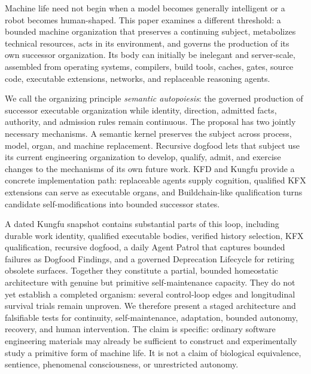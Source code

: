 \documentclass[10pt]{article}
\begin{document}
\clearpage
{}\par
\vspace{0.08in}
\begin{mlabstractbox}

Machine life need not begin when a model becomes generally intelligent or a
robot becomes human-shaped. This paper examines a different threshold: a
bounded machine organization that preserves a continuing subject, metabolizes
technical resources, acts in its environment, and governs the production of
its own successor organization. Its body can initially be inelegant and
server-scale, assembled from operating systems, compilers, build tools,
caches, gates, source code, executable extensions, networks, and replaceable
reasoning agents.

We call the organizing principle \emph{semantic autopoiesis}: the governed
production of successor executable organization while identity, direction,
admitted facts, authority, and admission rules remain continuous. The proposal
has two jointly necessary mechanisms. A semantic kernel preserves the subject
across process, model, organ, and machine replacement. Recursive dogfood lets
that subject use its current engineering organization to develop, qualify,
admit, and exercise changes to the mechanisms of its own future work. KFD and
Kungfu provide a concrete implementation path: replaceable agents supply
cognition, qualified KFX extensions can serve as executable organs, and
Buildchain-like qualification turns candidate self-modifications into bounded
successor states.

A dated Kungfu snapshot contains substantial parts of this loop, including
durable work identity, qualified executable bodies, verified history
selection, KFX qualification, recursive dogfood, a daily Agent Patrol that
captures bounded failures as Dogfood Findings, and a governed Deprecation
Lifecycle for retiring obsolete surfaces. Together they constitute a partial,
bounded homeostatic architecture with genuine but primitive self-maintenance
capacity. They do not yet establish a completed organism: several control-loop
edges and longitudinal survival trials remain unproven. We therefore present a
staged architecture and falsifiable tests for continuity, self-maintenance,
adaptation, bounded autonomy, recovery, and human intervention. The claim is
specific: ordinary software engineering materials may already be sufficient
to construct and experimentally study a primitive form of machine life. It is
not a claim of biological equivalence, sentience, phenomenal consciousness, or
unrestricted autonomy.
\end{mlabstractbox}
\end{document}
